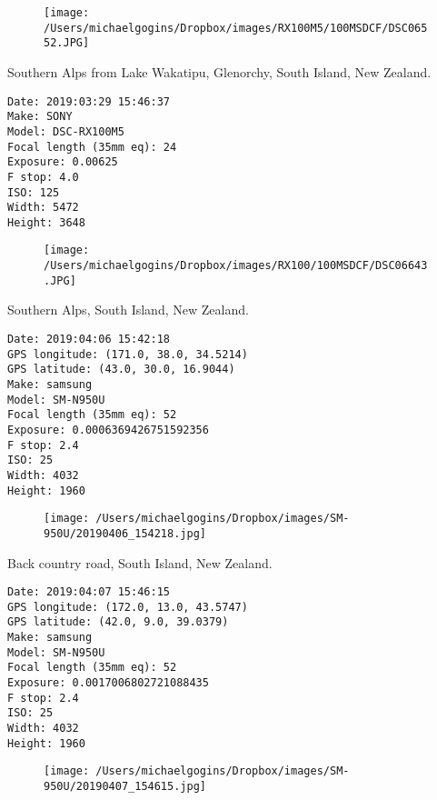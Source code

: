 \documentclass[11pt,letter,DIV=14,paper=landscape]{scrbook}
\begin{document}
\begin{figure}
\texttt{[image: /Users/michaelgogins/Dropbox/images/RX100M5/100MSDCF/DSC06552.JPG]}
\end{figure}
    
\clearpage
\noindent Southern Alps from Lake Wakatipu, Glenorchy, South Island, New Zealand.
\noindent
\begin{lstlisting}
Date: 2019:03:29 15:46:37
Make: SONY
Model: DSC-RX100M5
Focal length (35mm eq): 24
Exposure: 0.00625
F stop: 4.0
ISO: 125
Width: 5472
Height: 3648
\end{lstlisting}
\clearpage

\begin{figure}
\texttt{[image: /Users/michaelgogins/Dropbox/images/RX100/100MSDCF/DSC06643.JPG]}
\end{figure}
    
\clearpage
\noindent Southern Alps, South Island, New Zealand.
\noindent
\begin{lstlisting}
Date: 2019:04:06 15:42:18
GPS longitude: (171.0, 38.0, 34.5214)
GPS latitude: (43.0, 30.0, 16.9044)
Make: samsung
Model: SM-N950U
Focal length (35mm eq): 52
Exposure: 0.0006369426751592356
F stop: 2.4
ISO: 25
Width: 4032
Height: 1960
\end{lstlisting}
\clearpage

\begin{figure}
\texttt{[image: /Users/michaelgogins/Dropbox/images/SM-950U/20190406\_154218.jpg]}
\end{figure}
    
\clearpage
\noindent Back country road, South Island, New Zealand.
\noindent
\begin{lstlisting}
Date: 2019:04:07 15:46:15
GPS longitude: (172.0, 13.0, 43.5747)
GPS latitude: (42.0, 9.0, 39.0379)
Make: samsung
Model: SM-N950U
Focal length (35mm eq): 52
Exposure: 0.0017006802721088435
F stop: 2.4
ISO: 25
Width: 4032
Height: 1960
\end{lstlisting}
\clearpage

\begin{figure}
\texttt{[image: /Users/michaelgogins/Dropbox/images/SM-950U/20190407\_154615.jpg]}
\end{figure}
    
\end{document}
